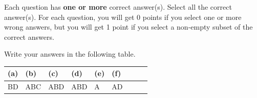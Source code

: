 
Each question has \textbf{one or more} correct answer(s). Select all the correct answer(s). For each question, you will get 0 points if you select one or more wrong answers, but you will get 1 point if you select a non-empty subset of the correct answers.

Write your answers in the following table.


\begin{table}[htbp]
	\centering
	\begin{tabular}{|p{1.7cm}|p{1.7cm}|p{1.7cm}|p{1.7cm}|p{1.7cm}|p{1.7cm}|p{1.7cm}|p{1.7cm}|p{1.7cm}|}
		\hline
		(a) & (b) & (c) & (d) & (e) & (f) \\
		\hline
		   BD &  ABC   &  ABD   &  ABD   &   A  &  AD   \\
		\hline
	\end{tabular}
\end{table}

